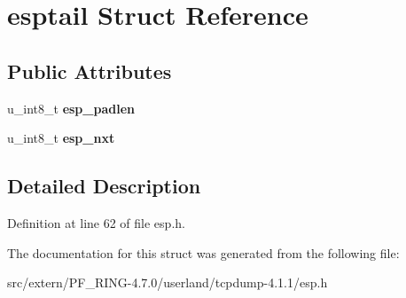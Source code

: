 \hypertarget{structesptail}{
\section{esptail Struct Reference}
\label{structesptail}
}
\subsection*{Public Attributes}
\begin{DoxyCompactItemize}
\item 
\hypertarget{structesptail_a4b540bde778514de25f5f43455b15775}{
u\_\-int8\_\-t {\bfseries esp\_\-padlen}}
\label{structesptail_a4b540bde778514de25f5f43455b15775}

\item 
\hypertarget{structesptail_a09b4db4b8f1315702451d663593fef03}{
u\_\-int8\_\-t {\bfseries esp\_\-nxt}}
\label{structesptail_a09b4db4b8f1315702451d663593fef03}

\end{DoxyCompactItemize}


\subsection{Detailed Description}


Definition at line 62 of file esp.h.



The documentation for this struct was generated from the following file:\begin{DoxyCompactItemize}
\item 
src/extern/PF\_\-RING-\/4.7.0/userland/tcpdump-\/4.1.1/esp.h\end{DoxyCompactItemize}
